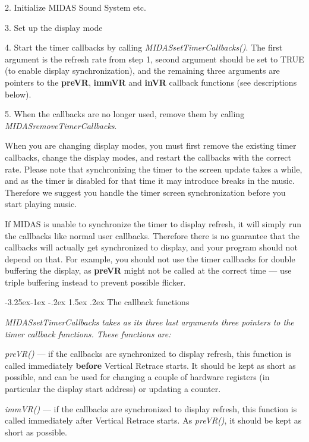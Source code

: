 \documentclass[a4paper,12pt,oneside]{book}
\makeatletter
\renewcommand\subsection{\@startsection{subsection}{2}{-20pt}%
                                     {-3.25ex\@plus -1ex \@minus -.2ex}%
                                     {1.5ex \@plus .2ex}%
                                     {\normalfont\large\bfseries}}
\newcommand{\mVariable}[1]{{\bf #1}}
\makeatother
\begin{document}
2. Initialize MIDAS Sound System etc.

3. Set up the display mode

4. Start the timer callbacks by calling {\em
MIDASsetTimerCallbacks()}. The first argument is the refresh rate from
step 1, second argument should be set to TRUE (to enable display
synchronization), and the remaining three arguments are pointers to the
\mVariable{preVR}, \mVariable{immVR} and \mVariable{inVR} callback
functions (see descriptions below).

5. When the callbacks are no longer used, remove them by calling {\em
MIDASremoveTimerCallbacks}.

When you are changing display modes, you must first remove the existing
timer callbacks, change the display modes, and restart the callbacks
with the correct rate. Please note that synchronizing the timer to
the screen update takes a while, and as the timer is disabled for that time
it may introduce breaks in the music. Therefore we suggest you handle the
timer screen synchronization before you start playing music.

If MIDAS is unable to synchronize the timer to display refresh, it will
simply run the callbacks like normal user callbacks. Therefore there is
no guarantee that the callbacks will actually get synchronized to
display, and your program should not depend on that. For example, you
should not use the timer callbacks for double buffering the display, as
\mVariable{preVR} might not be called at the correct time --- use triple
buffering instead to prevent possible flicker.


\subsection{The callback functions}

\em{MIDASsetTimerCallbacks} takes as its three last arguments three
pointers to the timer callback functions. These functions are:

{\em preVR()} --- if the callbacks are synchronized to display refresh,
this function is called immediately {\bf before} Vertical Retrace
starts. It should be kept as short as possible, and can be used for
changing a couple of hardware registers (in particular the display start
address) or updating a counter.

{\em immVR()} --- if the callbacks are synchronized to display refresh,
this function is called immediately after Vertical Retrace starts. As
{\em preVR()}, it should be kept as short as possible.
\end{document}
